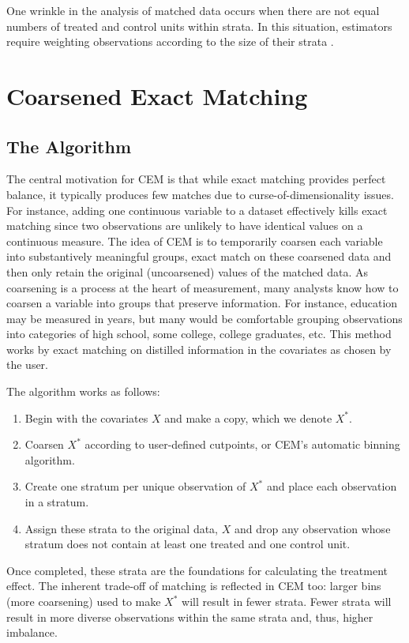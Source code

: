 \documentclass[11pt,titlepage]{article}
\begin{document}
One wrinkle in the analysis of matched data occurs when there are not
equal numbers of treated and control units within strata. In this
situation, estimators require weighting observations according to the size
of their strata \citep{IacKinPor12}.

\section{Coarsened Exact Matching} 

\subsection{The Algorithm}

The central motivation for CEM is that while exact matching provides
perfect balance, it typically produces few matches due to
curse-of-dimensionality issues. For instance, adding one continuous
variable to a dataset effectively kills exact matching since two
observations are unlikely to have identical values on a continuous
measure. The idea of CEM is to temporarily coarsen each variable into
substantively meaningful groups, exact match on these coarsened data
and then only retain the original (uncoarsened) values of the matched
data.  As coarsening is a process at the heart of measurement, many
analysts know how to coarsen a variable into groups that preserve
information. For instance, education may be measured in years, but
many would be comfortable grouping observations into categories of
high school, some college, college graduates, etc. This method works
by exact matching on distilled information in the covariates as chosen
by the user.

The algorithm works as follows:
\begin{enumerate}
\item Begin with the covariates $X$ and make a copy, which we denote
  $X^*$.
\item Coarsen $X^*$ according to user-defined cutpoints, or CEM's
  automatic binning algorithm.
\item Create one stratum per unique observation of $X^*$ and place each
  observation in a stratum.
\item Assign these strata to the original data, $X$ and drop any
  observation whose stratum does not contain at least one treated and
  one control unit.
\end{enumerate}

Once completed, these strata are the foundations for calculating the
treatment effect.  The inherent trade-off of matching is reflected in
CEM too: larger bins (more coarsening) used to make $X^*$ will result
in fewer strata. Fewer strata will result in more diverse observations
within the same strata and, thus, higher imbalance.
\end{document}
